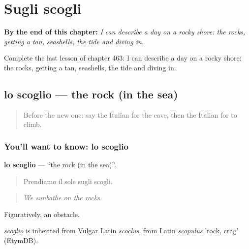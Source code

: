 
\chapter{Sugli scogli}
\label{ch:it-sugli-scogli}

\begin{chapteropening}
\textbf{By the end of this chapter:} \emph{I can describe a day on a rocky shore: the rocks, getting a tan, seashells, the tide and diving in.}

Complete the last lesson of chapter 463: I can describe a day on a rocky shore: the rocks, getting a tan, seashells, the tide and diving in.
\end{chapteropening}

\section[lo scoglio]{lo scoglio — the rock (in the sea)}

\label{lesson:IT-C463-scoglio}



\begin{quote}
Before the new one: say the Italian for the cave, then the Italian for to climb.
\end{quote}

\subsection*{You'll want to know: lo scoglio}
\textbf{lo scoglio} — \textquotedblleft{}the rock (in the sea)\textquotedblright{}.

\begin{quote}
Prendiamo il sole sugli scogli.
\end{quote}

\begin{quote}
\emph{We sunbathe on the rocks.}
\end{quote}

Figuratively, an obstacle.

\begin{cousinweb}
\emph{scoglio} is inherited from Vulgar Latin \emph{scoclus}, from Latin \emph{scopulus} 'rock, crag' (EtymDB).
\end{cousinweb}

